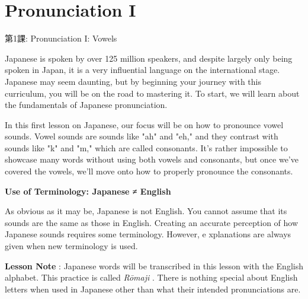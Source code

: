     
\chapter{Pronunciation I}

\begin{center}
\begin{Large}
第1課: Pronunciation I: Vowels     
\end{Large}
\end{center}
 
\par{ Japanese is spoken by over 125 million speakers, and despite largely only being spoken in Japan, it is a very influential language on the international stage. Japanese may seem daunting, but by beginning your journey with this curriculum, you will be on the road to mastering it. To start, we will learn about the fundamentals of Japanese pronunciation. }

\par{ In this first lesson on Japanese, our focus will be on how to pronounce vowel sounds. Vowel sounds are sounds like "ah" and "eh," and they contrast with sounds like "k" and "m," which are called consonants. It's rather impossible to showcase many words without using both vowels and consonants, but once we've covered the vowels, we'll move onto how to properly pronounce the consonants. }

\begin{center}
\textbf{Use of Terminology: Japanese ≠ English }\hfill\break

\end{center}

\par{ As obvious as it may be, Japanese is not English. You cannot assume that its sounds are the same as those in English. Creating an accurate perception of how Japanese sounds requires some terminology. However, e xplanations are always given when new terminology is used. }

\par{\textbf{Lesson Note }: Japanese words will be transcribed in this lesson with the English alphabet. This practice is called \emph{Rōmaji }. There is nothing special about English letters when used in Japanese other than what their intended pronunciations are. }
      
